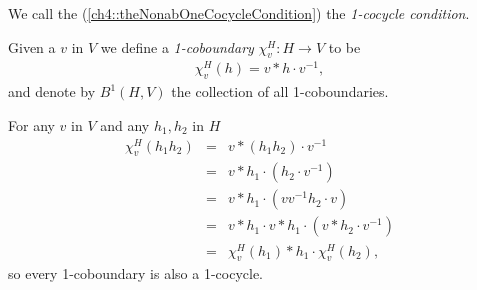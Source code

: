 We call the (\ref{ch4::theNonabOneCocycleCondition}) the \emph{1-cocycle condition}.



Given a $v$ in $V$ we define a \emph{1-coboundary} $\chi^H_v:H\rightarrow V$ to be
\begin{eqnarray*}
	\chi^H_v (h) = v * h\cdot v^{-1},
\end{eqnarray*}
and denote by $B^1\left(H, V\right)$ the collection of all 1-coboundaries. 

For any $v$ in $V$ and any $h_1, h_2$ in $H$
\begin{eqnarray*}
	\chi^H_v(h_1h_2) &=& v * (h_1h_2)\cdot v^{-1} \\
	&=& v * h_1 \cdot \left(h_2\cdot v^{-1} \right)\\
	&=& v * h_1 \cdot \left(v v^{-1} h_2\cdot v \right)\\
	&=& v * h_1\cdot v * h_1\cdot \left( v * h_2\cdot v^{-1}\right)\\
	&=& \chi^H_v(h_1) * h_1\cdot \chi^H_v(h_2),
\end{eqnarray*}
so every 1-coboundary is also a 1-cocycle. 

